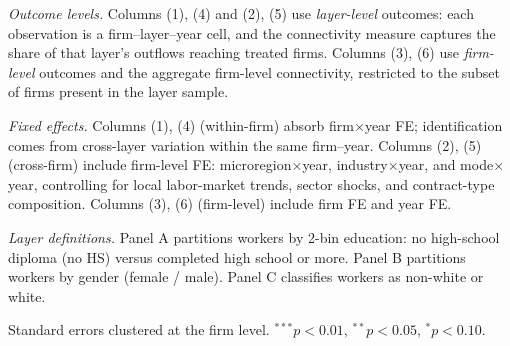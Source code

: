 \begin{table}[H]
\begin{minipage}{\linewidth}
\textit{Outcome levels.} Columns (1), (4) and (2), (5) use \textit{layer-level} outcomes: each observation is a firm--layer--year cell, and the connectivity measure captures the share of that layer's outflows reaching treated firms. Columns (3), (6) use \textit{firm-level} outcomes and the aggregate firm-level connectivity, restricted to the subset of firms present in the layer sample.

\textit{Fixed effects.} Columns (1), (4) (within-firm) absorb firm$\times$year FE; identification comes from cross-layer variation within the same firm--year. Columns (2), (5) (cross-firm) include firm-level FE: microregion$\times$year, industry$\times$year, and mode$\times$year, controlling for local labor-market trends, sector shocks, and contract-type composition. Columns (3), (6) (firm-level) include firm FE and year FE.

\textit{Layer definitions.} Panel A partitions workers by 2-bin education: no high-school diploma (no HS) versus completed high school or more. Panel B partitions workers by gender (female / male). Panel C classifies workers as non-white or white.

Standard errors clustered at the firm level. $^{***}p<0.01$, $^{**}p<0.05$, $^{*}p<0.10$.
\end{minipage}
\end{table}